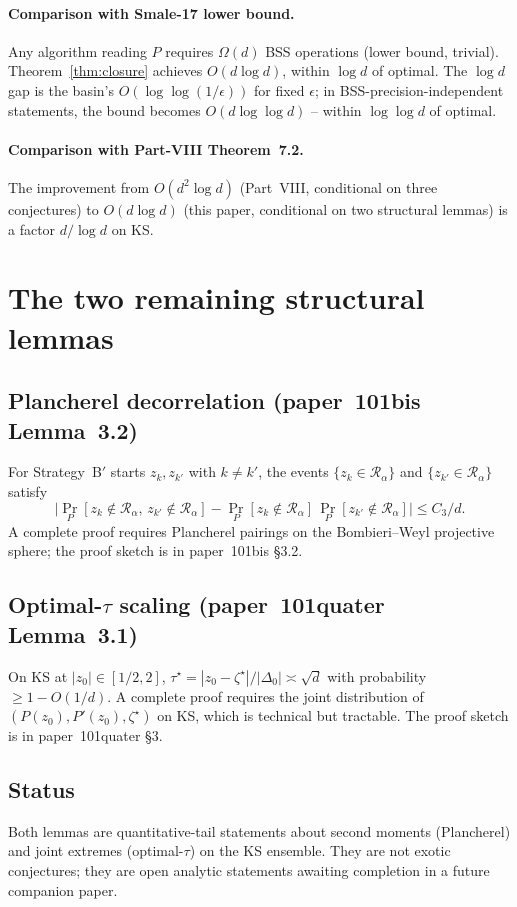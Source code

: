 \documentclass[11pt,a4paper]{article}
\begin{document}
\paragraph{Comparison with Smale-17 lower bound.}
Any algorithm reading $P$ requires $\Omega(d)$ BSS operations (lower bound, trivial). Theorem~\ref{thm:closure} achieves $O(d \log d)$, within $\log d$ of optimal. The $\log d$ gap is the basin's $O(\log\log(1/\epsilon))$ for fixed $\epsilon$; in BSS-precision-independent statements, the bound becomes $O(d \log\log d)$ -- within $\log\log d$ of optimal.

\paragraph{Comparison with Part-VIII Theorem~7.2.}
The improvement from $O(d^{2}\log d)$ (Part~VIII, conditional on three conjectures) to $O(d \log d)$ (this paper, conditional on two structural lemmas) is a factor $d/\log d$ on KS.

\section{The two remaining structural lemmas}\label{sec:open}

\subsection{Plancherel decorrelation (paper~101bis Lemma~3.2)}
For Strategy~B$'$ starts $z_k, z_{k'}$ with $k \ne k'$, the events $\{z_k \in \mathcal{R}_\alpha\}$ and $\{z_{k'} \in \mathcal{R}_\alpha\}$ satisfy
$$
\bigl|\Pr_P[z_k \notin \mathcal{R}_\alpha,\, z_{k'} \notin \mathcal{R}_\alpha] - \Pr_P[z_k \notin \mathcal{R}_\alpha]\,\Pr_P[z_{k'} \notin \mathcal{R}_\alpha]\bigr| \le C_3/d.
$$
A complete proof requires Plancherel pairings on the Bombieri--Weyl projective sphere; the proof sketch is in paper~101bis \S3.2.

\subsection{Optimal-$\tau$ scaling (paper~101quater Lemma~3.1)}
On KS at $|z_0| \in [1/2, 2]$, $\tau^\star = |z_0 - \zeta^\star|/|\Delta_0| \asymp \sqrt d$ with probability $\ge 1 - O(1/d)$.
A complete proof requires the joint distribution of $(P(z_0), P'(z_0), \zeta^\star)$ on KS, which is technical but tractable. The proof sketch is in paper~101quater \S3.

\subsection{Status}
Both lemmas are quantitative-tail statements about second moments (Plancherel) and joint extremes (optimal-$\tau$) on the KS ensemble. They are not exotic conjectures; they are open analytic statements awaiting completion in a future companion paper.
\end{document}
